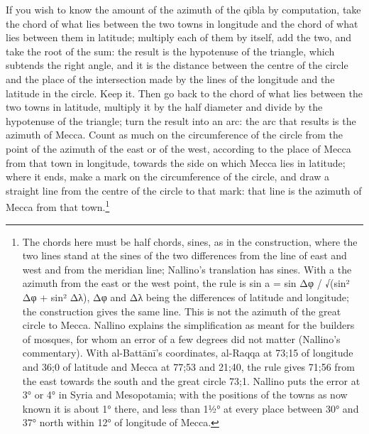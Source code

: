 \documentclass[11pt]{article}
\newcommand{\ArPage}[1]{\marginpar{\footnotesize\color{gray}Ar.\,p.\,#1}}
\begin{document}
\par \ArPage{207}If you wish to know the amount of the azimuth of the qibla by computation, take the chord of what lies between the two towns in longitude and the chord of what lies between them in latitude; multiply each of them by itself, add the two, and take the root of the sum: the result is the hypotenuse of the triangle, which subtends the right angle, and it is the distance between the centre of the circle and the place of the intersection made by the lines of the longitude and the latitude in the circle. Keep it. Then go back to the chord of what lies between the two towns in latitude, multiply it by the half diameter and divide by the hypotenuse of the triangle; turn the result into an arc: the arc that results is the azimuth of Mecca. Count as much on the circumference of the circle from the point of the azimuth of the east or of the west, according to the place of Mecca from that town in longitude, towards the side on which Mecca lies in latitude; where it ends, make a mark on the circumference of the circle, and draw a straight line from the centre of the circle to that mark: that line is the azimuth of Mecca from that town.\footnote{The chords here must be half chords, sines, as in the construction, where the two lines stand at the sines of the two differences from the line of east and west and from the meridian line; Nallino's translation has sines. With a the azimuth from the east or the west point, the rule is sin a = sin Δφ / √(sin² Δφ + sin² Δλ), Δφ and Δλ being the differences of latitude and longitude; the construction gives the same line. This is not the azimuth of the great circle to Mecca. Nallino explains the simplification as meant for the builders of mosques, for whom an error of a few degrees did not matter (Nallino's commentary). With al-Battānī's coordinates, al-Raqqa at 73;15 of longitude and 36;0 of latitude and Mecca at 77;53 and 21;40, the rule gives 71;56 from the east towards the south and the great circle 73;1. Nallino puts the error at 3° or 4° in Syria and Mesopotamia; with the positions of the towns as now known it is about 1° there, and less than 1½° at every place between 30° and 37° north within 12° of longitude of Mecca.}\par
\end{document}

